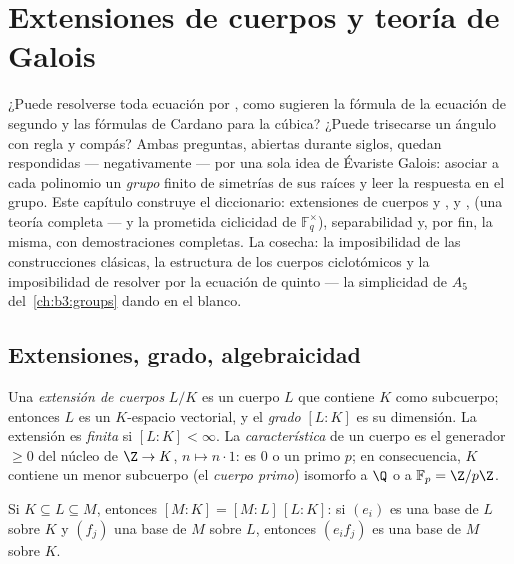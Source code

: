 \chapter{Extensiones de cuerpos y teoría de Galois}\label{ch:b3:galois}

¿Puede resolverse toda ecuación por
, como sugieren la fórmula de
la ecuación de segundo  y las fórmulas de Cardano para la cúbica?
¿Puede trisecarse un ángulo con regla y compás? Ambas preguntas,
abiertas durante siglos, quedan respondidas --- negativamente --- por
una sola idea de Évariste Galois: asociar
a cada polinomio un \emph{grupo} finito de simetrías de sus raíces y
leer la respuesta en el grupo. Este capítulo construye el diccionario:
extensiones de cuerpos y
,
 y
,
 (una teoría
completa --- y la prometida ciclicidad de $\mathbb F_q^\times$),
separabilidad y, por fin, la
 misma, con
demostraciones completas. La cosecha: la imposibilidad de las
construcciones clásicas, la estructura de los cuerpos ciclotómicos y la
imposibilidad de resolver por 
la ecuación de quinto  --- la simplicidad de $A_5$
del~\cref{ch:b3:groups} dando en el blanco.

\section{Extensiones, grado, algebraicidad}

\begin{definition}\label{def:b3:galois:extension}
Una \emph{extensión de cuerpos} $L/K$ es un
cuerpo $L$ que contiene $K$ como subcuerpo; entonces $L$ es un
$K$-espacio vectorial, y el \emph{grado}
$[L:K]$ es su dimensión. La extensión es \emph{finita} si $[L:K] <
\infty$. La \emph{característica} de un cuerpo es el generador $\geq 0$
del núcleo de $\Z \to K$, $n \mapsto n\cdot 1$: es $0$ o un primo $p$;
en consecuencia, $K$ contiene un menor subcuerpo (el \emph{cuerpo
primo}) isomorfo a $\Q$ o a $\mathbb
F_p = \Z/p\Z$.
\end{definition}

\begin{theorem}\label{thm:b3:galois:tower}
Si $K \subseteq L \subseteq M$, entonces $[M:K] = [M:L]\,[L:K]$: si
$(e_i)$ es una base de $L$ sobre $K$ y $(f_j)$ una base de $M$ sobre
$L$, entonces $(e_if_j)$ es una base de $M$ sobre $K$.
\end{theorem}

